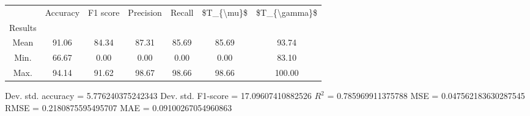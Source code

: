 \begin{tabular}{|c|c|c|c|c|c|c|}
\toprule
{} &  Accuracy &  F1 score &  Precision &  Recall &  \$T\_\{\textbackslash mu\}\$ &  \$T\_\{\textbackslash gamma\}\$ \\
Results &           &           &            &         &            &               \\
\hline
Mean    &     91.06 &     84.34 &      87.31 &   85.69 &      85.69 &         93.74 \\
Min.    &     66.67 &      0.00 &       0.00 &    0.00 &       0.00 &         83.10 \\
Max.    &     94.14 &     91.62 &      98.67 &   98.66 &      98.66 &        100.00 \\
\bottomrule
\end{tabular}

 Dev. std. accuracy = 5.776240375242343
 Dev. std. F1-score = 17.09607410882526
 $R^2$ = 0.785969911375788
 MSE = 0.047562183630287545
 RMSE = 0.2180875595495707
 MAE = 0.09100267054960863